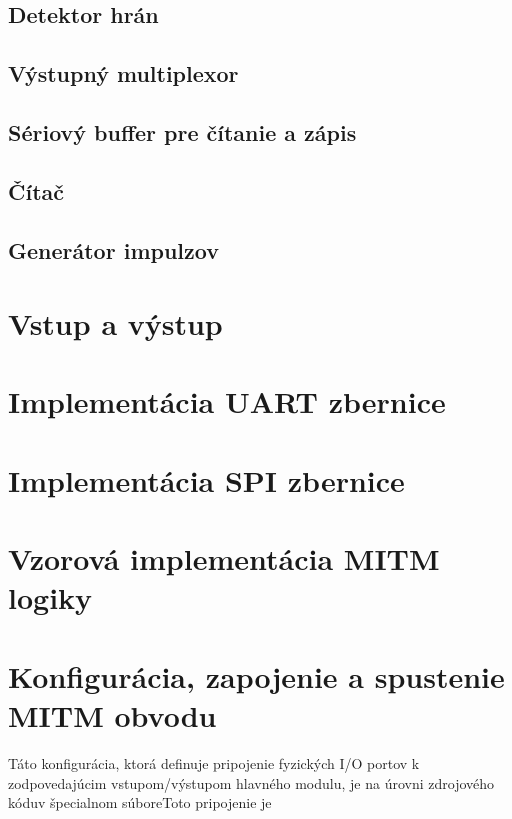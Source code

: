 \subsection{Detektor hrán}

\subsection{Výstupný multiplexor}\label{subsek:multiplexor}

\subsection{Sériový buffer pre čítanie a zápis}

\subsection{Čítač}

\subsection{Generátor impulzov}

\section{Vstup a výstup}

\section{Implementácia UART zbernice}

\section{Implementácia SPI zbernice}

\section{Vzorová implementácia MITM logiky}

\section{Konfigurácia, zapojenie a spustenie MITM obvodu}
Táto konfigurácia, ktorá definuje pripojenie fyzických I/O portov k zodpovedajúcim vstupom/výstupom hlavného modulu, je na úrovni zdrojového kóduv špecialnom súboreToto pripojenie je 